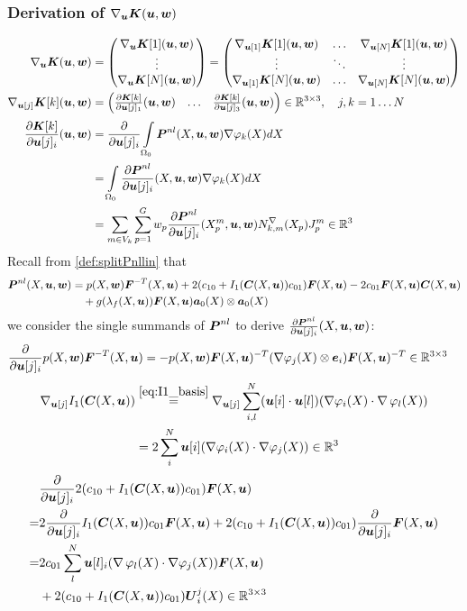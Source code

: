 \subsubsection{Derivation of $\nabla_{\vu}\vK(\vu,\vw)$}
\begin{align*}
	\nabla_{\vu}\vK(\vu,\vw) &= \m{\nabla_{\vu}\vK[1](\vu,\vw)\\ \vdots \\ \nabla_{\vu}\vK[N](\vu,\vw)}
	 = \m{\nabla_{\vu[1]}\vK[1](\vu,\vw) & \ldots & \nabla_{\vu[N]}\vK[1](\vu,\vw)\\
	 	\vdots & \ddots & \vdots\\
	   \nabla_{\vu[1]}\vK[N](\vu,\vw) & \ldots & \nabla_{\vu[N]}\vK[N](\vu,\vw)}\\
	\nabla_{\vu[j]}\vK[k](\vu,\vw) &=\m{\d{\vK[k]}{\vu[j]_1}(\vu,\vw) & \ldots & \d{\vK[k]}{\vu[j]_3}(\vu,\vw)}\in\R^{3\times 3},\quad j,k=1\ldots N\\
	\d{\vK[k]}{\vu[j]_i}(\vu,\vw) &= \d{}{\vu[j]_i} \intor\vPnl(X,\vu,\vw)\dpk dX\\
		&=  \intor\d{\vPnl}{\vu[j]_i}(X,\vu,\vw) \dpk dX\\
		&= \sumvk\sumgp w_p \d{\vPnl}{\vu[j]_i}(\pmp,\vu,\vw) \dNkmp\jmp\in\R^3
\end{align*}
Recall from \eqref{def:splitPnllin} that
\begin{align*}
\vPnl(X,\vu,\vw) &= p(X,\vw)\vF^{-T}(X,\vu) + 2(c_{10} + I_1(\vC(X,\vu))c_{01})\vF(X,\vu) - 2c_{01}\vF(X,\vu)\vC(X,\vu)\\
	     &\quad+g(\lambda_f(X,\vu))\vF(X,\vu)\va_0(X)\otimes\va_0(X)
\end{align*}
we consider the single summands of $\vPnl$ to derive $\d{\vPnl}{\vu[j]_i}(X,\vu,\vw)$:
\begin{align*}
	 \d{}{\vu[j]_i}p(X,\vw)\vF^{-T}(X,\vu) &= -p(X,\vw)\vF(X,\vu)^{-T}(\dpj\otimes\ve_i)\vF(X,\vu)^{-T}\in\R^{3\times 3}
\end{align*}
\begin{align*}
	\nabla_{\vu[j]}I_1(\vC(X,\vu)) &\re{eq:I1_basis} \nabla_{\vu[j]}\suml{i,l}{N} (\vu[i] \cdot \vu[l])(\dpi \cdot \divergence\varphi_l(X))\\
	&= 2\suml{i}{N} \vu[i](\dpi \cdot \dpj) \in\R^3
\end{align*}
\begin{align*}	 
	 &\d{}{\vu[j]_i}2(c_{10} + I_1(\vC(X,\vu))c_{01})\vF(X,\vu)\\
	 =& 2\d{}{\vu[j]_i}I_1(\vC(X,\vu))c_{01}\vF(X,\vu) + 2(c_{10} + I_1(\vC(X,\vu))c_{01})\d{}{\vu[j]_i}\vF(X,\vu)\\
	 =& 2c_{01}\suml{l}{N} \vu[l]_i(\divergence\varphi_l(X) \cdot \dpj)\vF(X,\vu)\\
	 &+ 2(c_{10} + I_1(\vC(X,\vu))c_{01})\vU^j_i(X)\in\R^{3\times 3}
\end{align*}
